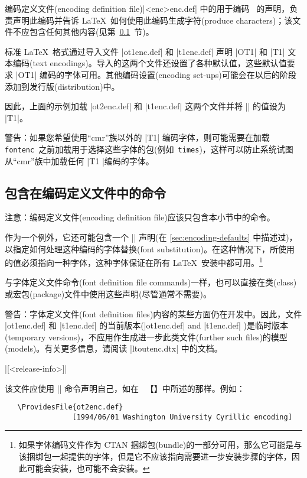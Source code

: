 \documentclass{ltxguide}[1995/11/28]
\newcommand{\heiti}{\CJKfamily{heiti}} %
\newcommand{\kaiti}{\CJKfamily{kaiti}} %
\begin{document}
编码定义文件(encoding definition file)|<enc>enc.def| 中的用于编码 \ 的声明，负责声明此编码并告诉 \LaTeX{}\ 如何使用此编码生成字符(produce characters)；该文件不应包含任何其他内容(见第~\ref{Sec:encode.def}~节)。

标准 \LaTeX{}\ 格式通过导入文件 |ot1enc.def| 和 |t1enc.def| 声明 |OT1| 和 |T1| 文本编码(text encodings)。导入的这两个文件还设置了各种默认值，这些默认值要求 |OT1| 编码的字体可用。其他编码设置(encoding set-ups)可能会在以后的阶段添加到发行版(distribution)中。

因此，上面的示例加载 |ot2enc.def| 和 |t1enc.def| 这两个文件并将 |\encodingdefault| 的值设为 |T1|。

{\kaiti 警告}：如果您希望使用“cmr”族以外的 |T1| 编码字体，则可能需要在加载 \texttt{fontenc}\ {\kaiti 之前}加载用于选择这些字体的包(例如~\texttt{times})，这样可以防止系统试图从“cmr”族中加载任何 |T1 |编码的字体。

\subsection[包含在编码定义文件中的命令]{\heiti 包含在编码定义文件中的命令}
\label{Sec:encode.def}

{\kaiti 注意}：编码定义文件(encoding definition file)应该只包含本小节中的命令。

  作为一个例外，它还可能包含一个 |\DeclareFontsubstitution| 声明(在 \ref{sec:encoding-defaults} 中描述过)，以指定如何处理这种编码的字体替换(font substitution)。在这种情况下，所使用的值必须指向一种字体，这种字体保证在所有 \LaTeX{}\ 安装中都可用。\footnote{如果字体编码文件作为 CTAN 捆绑包(bundle)的一部分可用，那么它可能是与该捆绑包一起提供的字体，但是它不应该指向需要进一步安装步骤的字体，因此可能会安装，也可能不会安装。}

与字体定义文件命令(font definition file commands)一样，也可以直接在类(class)或宏包(package)文件中使用这些声明(尽管通常不需要)。

{\kaiti 警告}：字体定义文件(font definition files)内容的某些方面仍在开发中。因此，文件 |ot1enc.def| 和 |t1enc.def| 的当前版本(|ot1enc.def| and |t1enc.def| )是临时版本(temporary versions)，不应用作生成进一步此类文件(further such files)的模型(models)。有关更多信息，请阅读 |ltoutenc.dtx| 中的文档。

\begin{decl}
  |[<release-info>]|
\end{decl}
该文件应使用 |\ProvidesFile| 命令声明自己，如在 {\color{blue}{\emph{\clsguide}}}\ 【{\color{blue}{《文档类和宏包作者的 \LaTeXe》}}】中所述的那样。例如：
\begin{verbatim}
   \ProvidesFile{ot2enc.def}
                [1994/06/01 Washington University Cyrillic encoding]
\end{verbatim}
\end{document}
